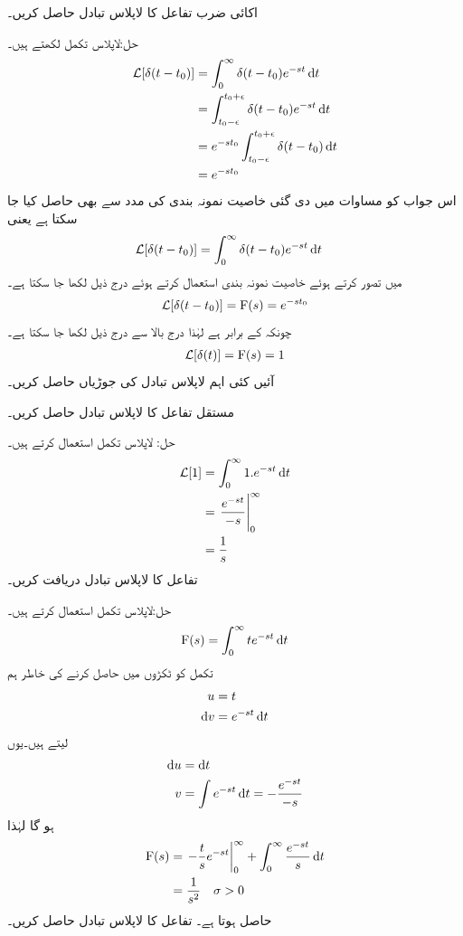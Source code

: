 اکائی ضرب تفاعل کا لاپلاس تبادل حاصل کریں۔

حل:لاپلاس تکمل لکھتے ہیں۔
\begin{align*}
\Laplace[\delta(t-t_0)]&=\int_0^{\infty} \delta(t-t_0) e^{-st} \dif t\\
&=\int_{t_0-\epsilon}^{t_0+\epsilon} \delta(t-t_0) e^{-st} \dif t\\
&=e^{-s t_0} \int_{t_0-\epsilon}^{t_0+\epsilon} \delta(t-t_0) \dif t\\
&=e^{-st_0}
\end{align*}
اس جواب  کو مساوات  میں دی گئی خاصیت نمونہ بندی کی مدد سے بھی حاصل کیا جا سکتا ہے یعنی
  \begin{align*}
\Laplace[\delta(t-t_0)]&=\int_0^{\infty} \delta(t-t_0) e^{-st} \dif t
\end{align*}
میں  تصور کرتے ہوئے خاصیت نمونہ بندی استعمال کرتے  ہوئے درج ذیل لکھا جا سکتا ہے۔
\begin{align}
\mathcal{L}[\delta(t-t_0)]={{\textup{F}}}(s)=e^{-st_0}
\end{align}
چونکہ  کے برابر ہے لہٰذا درج بالا سے درج ذیل لکھا جا سکتا ہے۔
\begin{align}
\mathcal{L}[\delta(t)]={{\textup{F}}}(s)=1
\end{align}
آئیں کئی اہم لاپلاس تبادل کی جوڑیاں حاصل کریں۔

مستقل تفاعل  کا لاپلاس تبادل حاصل کریں۔

حل: لاپلاس تکمل استعمال کرتے ہیں۔
\begin{align*}
\Laplace[1]&=\int_0^{\infty} 1.e^{-st}\dif t\\
&=\left.\frac{e^{-st}}{-s} \right|_0^{\infty}\\
&=\frac{1}{s}
\end{align*}
تفاعل  کا لاپلاس تبادل دریافت کریں۔

حل:لاپلاس تکمل استعمال کرتے ہیں۔
\begin{align*}
\bF(s)=\int_0^{\infty} t e^{-st} \dif t
\end{align*}
تکمل کو ٹکڑوں میں حاصل کرنے کی خاطر ہم 
\begin{align*}
u&=t\\
\dif v&=e^{-st} \dif t
\end{align*}
 لیتے ہیں۔یوں
\begin{align*}
\dif u &= \dif t\\
v&=\int e^{-st} \dif t=-\frac{e^{-st}}{-s}
\end{align*}
ہو گا لہٰذا
\begin{gather}
\begin{aligned}
\bF(s)&=\left. -\frac{t}{s}e^{-st}\right|_0^{\infty}+\int_0^{\infty} \frac{e^{-st}}{s} \dif t\\
&=\frac{1}{s^2} \quad \sigma>0
\end{aligned}
\end{gather}
حاصل ہوتا ہے۔
تفاعل  کا لاپلاس تبادل حاصل کریں۔


